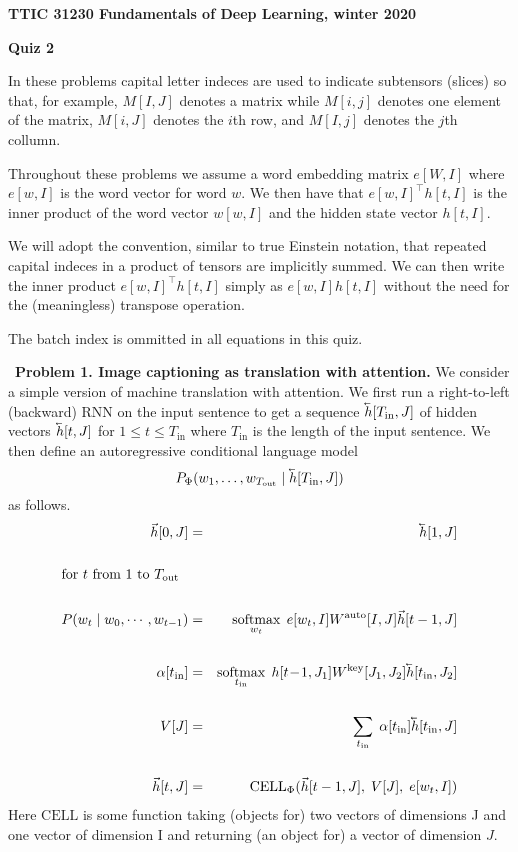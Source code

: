 \documentclass{article}
\begin{document}
\centerline{\bf TTIC 31230 Fundamentals of Deep Learning, winter 2020}
\medskip
\centerline{\bf Quiz 2}

\bigskip
In these problems capital letter indeces are used to indicate subtensors (slices) so that, for example,  $M[I,J]$ denotes a matrix
while $M[i,j]$ denotes one element of the matrix, $M[i,J]$ denotes the $i$th row, and $M[I,j]$ denotes the $j$th collumn.

\medskip
Throughout these problems we assume a word embedding matrix $e[W,I]$ where $e[w,I]$ is the word vector for word $w$. We then have that $e[w,I]^\top h[t,I]$
is the inner product of the word vector $w[w,I]$ and the hidden state vector $h[t,I]$.

\medskip
We will adopt the convention, similar to true Einstein notation, that repeated capital indeces in a product of tensors are implicitly summed.  We can then write
the inner product $e[w,I]^\top h[t,I]$ simply as $e[w,I]h[t,I]$ without the need for the (meaningless) transpose operation.

\medskip
The batch index is ommitted in all equations in this quiz.

\bigskip
~{\bf Problem 1. Image captioning as translation with attention.} We consider a simple version of machine translation with attention.  We first run a right-to-left (backward) RNN on the
input sentence to get a sequence $\cev{h}[T_{\mathrm{in}},J]$ of hidden vectors $\cev{h}[t,J]$ for $1 \leq t \leq T_{\mathrm{in}}$ where $T_{\mathrm{in}}$ is the length of the input sentence.  We then define an autoregressive conditional language model
$$P_\Phi(w_1,\ldots,w_{T_\mathrm{out}}\;|\; \cev{h}[T_{\mathrm{in}},J])$$
as follows.
\begin{eqnarray*}
  \vec{h}[0,J] & = & \cev{h}[1,J] \\
  \\
  \mbox{for $t$ from $1$ to $T_{\mathrm{out}}$ \vspace{2.5 in} ~} \\
  \\
P(w_t\;|\;w_0,\cdots,w_{t-1}) & = & \softmax_{w_t}\;e[w_t,I]W^{\mathrm{auto}}[I,J]\vec{h}[t-1,J] \\
\\
\alpha[t_{\mathrm{in}}]& =& \softmax_{t_\mathrm{in}} \;h[t\!-\!1,J_1]W^{\mathrm{key}}[J_1,J_2]\cev{h}[t_{\mathrm{in}},J_2]\\
\\
V[J]& = & \sum_{t_{\mathrm{in}}}\;\alpha[t_{\mathrm{in}}]\cev{h}[t_{\mathrm{in}},J] \\
\\
\vec{h}[t,J] & = & \mathrm{CELL}_\Phi (\vec{h}[t-1,J],\;V[J],\;e[w_t,I])
\end{eqnarray*}
Here $\mathrm{CELL}$ is some function taking (objects for) two vectors of dimensions J and one vector of dimension I and returning (an object for) a vector of dimension $J$.
\end{document}
